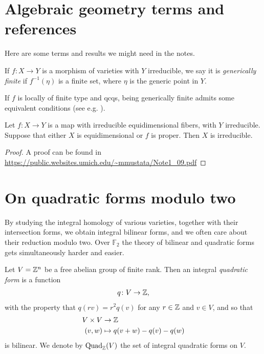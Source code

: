 \documentclass[11pt]{amsart}
\providecommand{\Quad}{\mathrm{Quad}}
\begin{document}
\appendix

\section{Algebraic geometry terms and references}

Here are some terms and results we might need in the notes.

\begin{definition}
\label{def:generically-finite}
If $f \colon X \to Y$ is a morphism of varieties with $Y$ irreducible, we say it is \textit{generically finite} if $f^{-1}(\eta)$ is a finite set, where $\eta$ is the generic point in $Y$.
\end{definition}

\begin{remark} If $f$ is locally of finite type and qcqs, being generically finite admits some equivalent conditions (see e.g. \cite[02NW]{Stacks}).
\end{remark}

\begin{proposition}\label{prop:irred-criterion}
Let $f\colon X\to Y$ is a map with irreducible equidimensional fibers, with $Y$ irreducible. Suppose that either $X$ is equidimensional or $f$ is proper. Then $X$ is irreducible.
\end{proposition}
\begin{proof} A proof can be found in \url{https://public.websites.umich.edu/~mmustata/Note1_09.pdf}
\end{proof}



\section{On quadratic forms modulo two}\label{sec:quad-forms-f2}

By studying the integral homology of various varieties, together with their intersection forms, we obtain integral bilinear forms, and we often care about their reduction modulo two. Over $\mathbb{F}_2$ the theory of bilinear and quadratic forms gets simultaneously harder and easier.

\begin{definition}
Let $V = \mathbb{Z}^n$ be a free abelian group of finite rank. Then an integral \textit{quadratic form} is a function
\begin{align*}
    q \colon V \to \mathbb{Z},
\end{align*}
with the property that $q(rv) = r^2 q(v)$ for any $r\in \mathbb{Z}$ and $v\in V$, and so that
\begin{align*}
    V \times V &\to \mathbb{Z} \\
    (v,w) &\mapsto q(v+w)-q(v)-q(w)
\end{align*}
is bilinear. We denote by $\Quad_\Z(V)$ the set of integral quadratic forms on $V$.
\end{definition}
\end{document}

